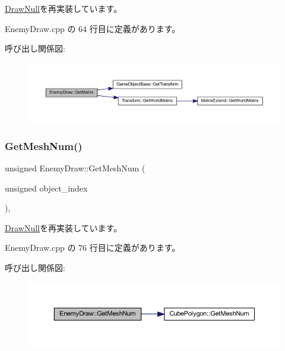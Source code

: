 \mbox{\hyperlink{class_draw_null_adede079e9c11a756090740b20bb43022}{Draw\+Null}}を再実装しています。



 Enemy\+Draw.\+cpp の 64 行目に定義があります。

呼び出し関係図\+:\nopagebreak
\begin{figure}[H]
\begin{center}
\leavevmode
\includegraphics[width=350pt]{class_enemy_draw_a6f2a052a45caf0d255112cbe81b8bfa3_cgraph}
\end{center}
\end{figure}
\mbox{\label{class_enemy_draw_acda1a2487aea432b08fc816351a12239}} 
\subsubsection{\texorpdfstring{Get\+Mesh\+Num()}{GetMeshNum()}}
{\footnotesize\ttfamily unsigned Enemy\+Draw\+::\+Get\+Mesh\+Num (\begin{DoxyParamCaption}\item[{unsigned}]{object\+\_\+index }\end{DoxyParamCaption})\hspace{0.3cm}{\ttfamily [override]}, {\ttfamily [virtual]}}



\mbox{\hyperlink{class_draw_null_ad735978a85a5f3583eecd82d6bfe6413}{Draw\+Null}}を再実装しています。



 Enemy\+Draw.\+cpp の 76 行目に定義があります。

呼び出し関係図\+:\nopagebreak
\begin{figure}[H]
\begin{center}
\leavevmode
\includegraphics[width=350pt]{class_enemy_draw_acda1a2487aea432b08fc816351a12239_cgraph}
\end{center}
\end{figure}
\mbox{\label{class_enemy_draw_aa1659c35fa757db6a6cf07e26ad9ddfb}} 
